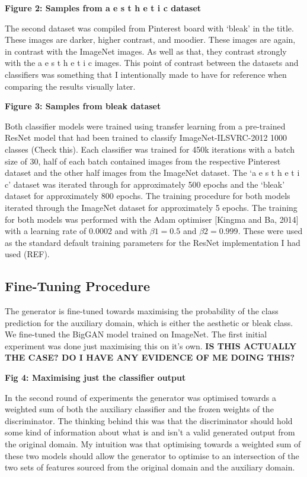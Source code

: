 \textbf{Figure 2: Samples from a e s t h e t i c dataset}

The second dataset was compiled from Pinterest board with ‘bleak’ in the title. 
These images are darker, higher contrast, and moodier. These images are again, in contrast with the ImageNet images. 
As well as that, they contrast strongly with the a e s t h e t i c images. 
This point of contrast between the datasets and classifiers was something that I intentionally made to have for reference when comparing the results visually later. 

\textbf{Figure 3: Samples from bleak dataset}

Both classifier models were trained using transfer learning from a pre-trained ResNet \citep{he2016deep} model that had been trained to classify ImageNet-ILSVRC-2012 1000 classes (Check this). 
Each classifier was trained for 450k iterations with a batch size of 30, half of each batch contained images from the respective Pinterest dataset and the other half images from the ImageNet dataset. 
The ‘a e s t h e t i c’ dataset was iterated through for approximately 500 epochs and the ‘bleak’ dataset for approximately 800 epochs. 
The training procedure for both models iterated through the ImageNet dataset for approximately 5 epochs. 
The training for both models was performed with the Adam optimiser [Kingma and Ba, 2014] with a learning rate of 0.0002 and with $\beta 1 = 0.5$ and $\beta 2 = 0.999$. 
These were used as the standard default training parameters for the ResNet implementation I had used (REF).

\subsection{Fine-Tuning Procedure}

The generator is fine-tuned towards maximising the probability of the class prediction for the auxiliary domain, which is either the aesthetic or bleak class. We fine-tuned the BigGAN model trained on ImageNet. The first initial experiment was done just maximising this on it’s own. \textbf{IS THIS ACTUALLY THE CASE? DO I HAVE ANY EVIDENCE OF ME DOING THIS?}

\textbf{Fig 4: Maximising just the classifier output}

In the second round of experiments the generator was optimised towards a weighted sum of both the auxiliary classifier and the frozen weights of the discriminator. 
The thinking behind this was that the discriminator should hold some kind of information about what is and isn’t a valid generated output from the original domain. 
My intuition was that optimising towards a weighted sum of these two models should allow the generator to optimise to an intersection of the two sets of features sourced from the original domain and the auxiliary domain.  


